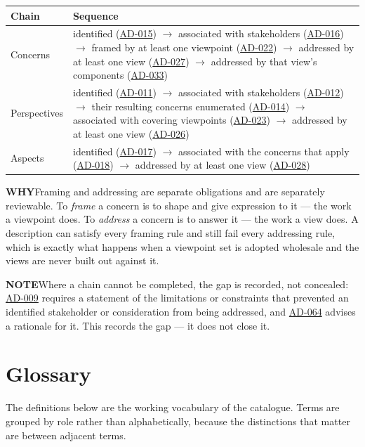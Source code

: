 \documentclass[11pt,a4paper]{report}
\newcommand{\calloutlead}[2]{{\sffamily\bfseries\footnotesize\color{#1}#2\quad}}
\newcommand{\why}[1]{\begin{whybox}\calloutlead{navy}{WHY}#1\end{whybox}}
\newcommand{\note}[1]{\begin{notebox}\calloutlead{slate}{NOTE}#1\end{notebox}}
\newcommand{\rref}[1]{\hyperref[rule:#1]{\textsf{\small #1}}}
\begin{document}
\begin{center}
\small
\begin{tabular}{@{}l L{112mm}@{}}
\toprule
\textbf{Chain} & \textbf{Sequence} \\
\midrule
Concerns
  & identified (\rref{AD-015}) $\rightarrow$ associated with
    stakeholders (\rref{AD-016}) $\rightarrow$ framed by at least one
    viewpoint (\rref{AD-022}) $\rightarrow$ addressed by at least one
    view (\rref{AD-027}) $\rightarrow$ addressed by that view's
    components (\rref{AD-033}) \\
\addlinespace
Perspectives
  & identified (\rref{AD-011}) $\rightarrow$ associated with
    stakeholders (\rref{AD-012}) $\rightarrow$ their resulting concerns
    enumerated (\rref{AD-014}) $\rightarrow$ associated with covering
    viewpoints (\rref{AD-023}) $\rightarrow$ addressed by at least one
    view (\rref{AD-026}) \\
\addlinespace
Aspects
  & identified (\rref{AD-017}) $\rightarrow$ associated with the
    concerns that apply (\rref{AD-018}) $\rightarrow$ addressed by at
    least one view (\rref{AD-028}) \\
\bottomrule
\end{tabular}
\end{center}

\why{Framing and addressing are separate obligations and are separately
reviewable. To \emph{frame} a concern is to shape and give expression to it ---
the work a viewpoint does. To \emph{address} a concern is to answer it --- the
work a view does. A description can satisfy every framing rule and still fail
every addressing rule, which is exactly what happens when a viewpoint set is
adopted wholesale and the views are never built out against it.}

\note{Where a chain cannot be completed, the gap is recorded, not concealed:
\rref{AD-009} requires a statement of the limitations or
constraints that prevented an identified stakeholder or consideration from being
addressed, and \rref{AD-064} advises a rationale for it. This
records the gap --- it does not close it.}

\chapter{Glossary}

The definitions below are the working vocabulary of the catalogue. Terms are
grouped by role rather than alphabetically, because the distinctions that matter
are between adjacent terms.
\end{document}
